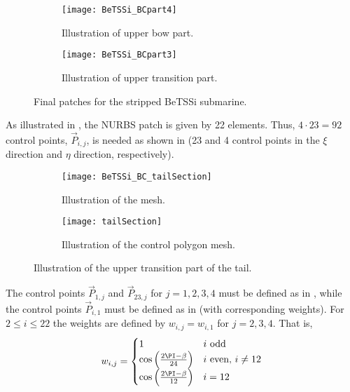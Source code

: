 \begin{figure}
	\centering    
	\begin{subfigure}{0.49\textwidth}
		\centering
		\texttt{[image: BeTSSi\_BCpart4]}
		\caption{Illustration of upper bow part.}
		\label{Fig2:bettsi_upperBow}
	\end{subfigure}%
	\hspace*{0.02\textwidth}%
	\begin{subfigure}{0.49\textwidth}
		\centering
		\texttt{[image: BeTSSi\_BCpart3]}
		\caption{Illustration of upper transition part.}
		\label{Fig2:bettsi_upperPartOfTailSection}
	\end{subfigure}
	\caption{Final patches for the stripped BeTSSi submarine.}
\end{figure}
As illustrated in , the NURBS patch is given by 22 elements. Thus, $4\cdot 23 = 92$ control points, $\vec{P}_{i,j}$, is needed as shown in  (23 and 4 control points in the $\xi$ direction and $\eta$ direction, respectively).
\begin{figure}
	\centering    
	\begin{subfigure}{0.49\textwidth}
		\centering
		\texttt{[image: BeTSSi\_BC\_tailSection]}
		\caption{Illustration of the mesh.}
		\label{Fig2:BeTSSi_BC_tailSection}
	\end{subfigure}%
	\hspace*{0.02\textwidth}%
	\begin{subfigure}{0.49\textwidth}
		\centering
		\texttt{[image: tailSection]}
		\caption{Illustration of the control polygon mesh.}
		\label{Fig2:BeTSSi_BC_tailSection_cp}
	\end{subfigure}
	\caption{Illustration of the upper transition part of the tail.}
\end{figure}
The control points $\vec{P}_{1,j}$ and $\vec{P}_{23,j}$ for $j=1,2,3,4$ must be defined as in , while the control points $\vec{P}_{i,1}$ must be defined as in  (with corresponding weights). For $2\leq i\leq 22$ the weights are defined by $w_{i,j}=w_{i,1}$ for $j=2,3,4$. That is,
\begin{equation}
	w_{i,j} = \begin{cases}
		1 & i\,\, \text{odd}\\
		\cos\left(\frac{2\PI-\beta}{24}\right) & i\,\, \text{even},\,i\neq 12\\
		\cos\left(\frac{2\PI-\beta}{12}\right) &  i = 12
		\end{cases}		
\end{equation}
